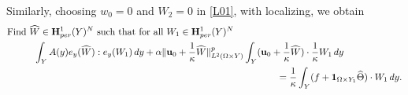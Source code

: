 \documentclass[11pt,a4paper]{article}
\numberwithin{equation}{section}
\def\1{{\bf 1}}
\def\O{\Omega}
\def\Ge{{\bf e}}
\def\wh{\widehat }
\def\X{\times }
\def\Ge{{\bf e}}
\def\Gu{{\bf u}}
\def\GH{{\bf H}}
\begin{document}
%
Similarly, choosing $w_0=0$ and $W_2=0$ in \eqref{L01}, with localizing, we obtain
\begin{equation}\label{5171}
	\begin{aligned}
		&\text{Find $\wh W\in \GH^1_{per}(Y)^N$ such that for all $W_1\in \GH^1_{per}(Y)^N$}\\
		&\hskip 10mm \int_{Y} A(y)e_y(\wh W): e_y(W_1)\,dy+\alpha\|\Gu_0+{1\over \kappa}\wh W\|^p_{L^2(\O\X Y)}\int_{Y}(\Gu_0+{1\over \kappa}\wh W)\cdot {1\over \kappa}W_1\,dy\\
		&\hskip 100mm={1\over \kappa}\int_{Y}(f+\1_{\O\X Y_1}{\wh \Theta})\cdot W_1\,dy.
	\end{aligned}
\end{equation}
\end{document}

